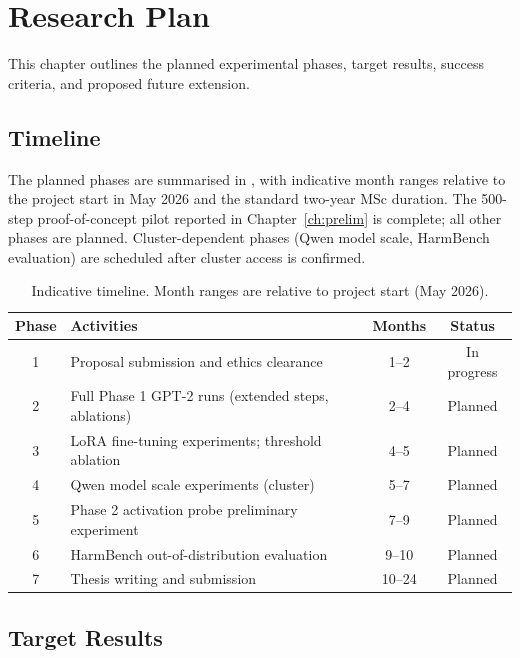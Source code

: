 \documentclass[a4paper,twoside,12pt]{report}
\begin{document}
\chapter{Research Plan}
\label{ch:plan}

This chapter outlines the planned experimental phases, target results, success criteria, and
proposed future extension.

\section{Timeline}

The planned phases are summarised in , with indicative month ranges
relative to the project start in May 2026 and the standard two-year MSc duration. The
500-step proof-of-concept pilot reported in Chapter~\ref{ch:prelim} is complete; all other
phases are planned. Cluster-dependent phases (Qwen model scale, HarmBench evaluation) are
scheduled after cluster access is confirmed.

\begin{table}[ht]
  \centering
  \caption{Indicative timeline. Month ranges are relative to project start (May 2026).}
  \label{tab:timeline}
  \begin{tabular}{clcc}
    \toprule
    \textbf{Phase} & \textbf{Activities} & \textbf{Months} & \textbf{Status} \\
    \midrule
    1 & Proposal submission and ethics clearance & 1--2 & In progress \\
    2 & Full Phase 1 GPT-2 runs (extended steps, ablations) & 2--4 & Planned \\
    3 & LoRA fine-tuning experiments; threshold ablation & 4--5 & Planned \\
    4 & Qwen model scale experiments (cluster) & 5--7 & Planned \\
    5 & Phase 2 activation probe preliminary experiment & 7--9 & Planned \\
    6 & HarmBench out-of-distribution evaluation & 9--10 & Planned \\
    7 & Thesis writing and submission & 10--24 & Planned \\
    \bottomrule
  \end{tabular}
\end{table}

\section{Target Results}
\end{document}
